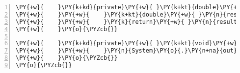 \begin{Verbatim}[commandchars=\\\{\},numbers=left,firstnumber=1,stepnumber=1,frame=single,fontsize=\small]
\PY{+w}{    }\PY{k+kd}{private}\PY{+w}{ }\PY{k+kt}{double}\PY{+w}{ }\PY{n+nf}{process}\PY{o}{(}\PY{k+kt}{double}\PY{+w}{ }\PY{n}{value}\PY{o}{)}\PY{+w}{ }\PY{o}{\PYZob{}}
\PY{+w}{    }\PY{+w}{    }\PY{k+kt}{double}\PY{+w}{ }\PY{n}{result}\PY{+w}{ }\PY{o}{=}\PY{+w}{ }\PY{n}{value}\PY{+w}{ }\PY{o}{*}\PY{+w}{ }\PY{n}{value}\PY{o}{;}
\PY{+w}{    }\PY{+w}{    }\PY{k}{return}\PY{+w}{ }\PY{n}{result}\PY{o}{;}
\PY{+w}{    }\PY{o}{\PYZcb{}}

\PY{+w}{    }\PY{k+kd}{private}\PY{+w}{ }\PY{k+kt}{void}\PY{+w}{ }\PY{n+nf}{output}\PY{o}{(}\PY{k+kt}{double}\PY{+w}{ }\PY{n}{result}\PY{o}{)}\PY{+w}{ }\PY{o}{\PYZob{}}
\PY{+w}{    }\PY{+w}{    }\PY{n}{System}\PY{o}{.}\PY{n+na}{out}\PY{o}{.}\PY{n+na}{println}\PY{o}{(}\PY{l+s}{"計算結果："}\PY{+w}{ }\PY{o}{+}\PY{+w}{ }\PY{n}{result}\PY{o}{)}\PY{o}{;}
\PY{+w}{    }\PY{o}{\PYZcb{}}
\PY{o}{\PYZcb{}}
\end{Verbatim}
